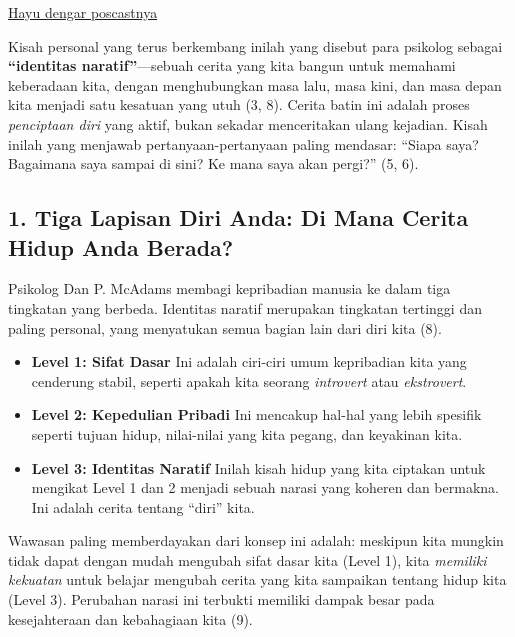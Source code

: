 \documentclass[
  letterpaper,
  DIV=11,
  numbers=noendperiod]{scrreprt}
\begin{document}
\href{./audio/Identitas_Naratif__Jadi_Sutradara_dan_Penulis_Kisah_Hidup_Anda_.mp4}{Hayu
dengar poscastnya}

Kisah personal yang terus berkembang inilah yang disebut para psikolog
sebagai \textbf{``identitas naratif''}---sebuah cerita yang kita bangun
untuk memahami keberadaan kita, dengan menghubungkan masa lalu, masa
kini, dan masa depan kita menjadi satu kesatuan yang utuh (3, 8). Cerita
batin ini adalah proses \emph{penciptaan diri} yang aktif, bukan sekadar
menceritakan ulang kejadian. Kisah inilah yang menjawab
pertanyaan-pertanyaan paling mendasar: ``Siapa saya? Bagaimana saya
sampai di sini? Ke mana saya akan pergi?'' (5, 6).

\subsection{\texorpdfstring{\textbf{1. Tiga Lapisan Diri Anda: Di Mana
Cerita Hidup Anda
Berada?}}{1. Tiga Lapisan Diri Anda: Di Mana Cerita Hidup Anda Berada?}}\label{tiga-lapisan-diri-anda-di-mana-cerita-hidup-anda-berada}

Psikolog Dan P. McAdams membagi kepribadian manusia ke dalam tiga
tingkatan yang berbeda. Identitas naratif merupakan tingkatan tertinggi
dan paling personal, yang menyatukan semua bagian lain dari diri kita
(8).

\begin{itemize}
\item
  \textbf{Level 1: Sifat Dasar} Ini adalah ciri-ciri umum kepribadian
  kita yang cenderung stabil, seperti apakah kita seorang
  \emph{introvert} atau \emph{ekstrovert}.
\item
  \textbf{Level 2: Kepedulian Pribadi} Ini mencakup hal-hal yang lebih
  spesifik seperti tujuan hidup, nilai-nilai yang kita pegang, dan
  keyakinan kita.
\item
  \textbf{Level 3: Identitas Naratif} Inilah kisah hidup yang kita
  ciptakan untuk mengikat Level 1 dan 2 menjadi sebuah narasi yang
  koheren dan bermakna. Ini adalah cerita tentang ``diri'' kita.
\end{itemize}

Wawasan paling memberdayakan dari konsep ini adalah: meskipun kita
mungkin tidak dapat dengan mudah mengubah sifat dasar kita (Level 1),
kita \emph{memiliki kekuatan} untuk belajar mengubah cerita yang kita
sampaikan tentang hidup kita (Level 3). Perubahan narasi ini terbukti
memiliki dampak besar pada kesejahteraan dan kebahagiaan kita (9).
\end{document}
